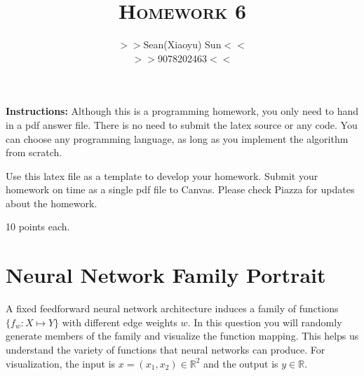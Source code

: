 \documentclass[a4paper]{article}
\title{\textsc{Homework 6}} %
\author{
$>>$Sean(Xiaoyu) Sun$<<$ \\
$>>$9078202463$<<$\\
}
\date{}
\theoremstyle{definition}
\def\R{\mathbb R}
\begin{document}
\maketitle 


\textbf{Instructions:} 
Although this is a programming homework, you only need to hand in a pdf answer file.
There is no need to submit the latex source or any code.
You can choose any programming language, as long as you implement the algorithm from scratch. 

Use this latex file as a template to develop your homework.
Submit your homework on time as a single pdf file to Canvas.
Please check Piazza for updates about the homework.

10 points each.

\section{Neural Network Family Portrait}
A fixed feedforward neural network architecture induces a family of functions $\{f_w: X \mapsto Y\}$ with different edge weights $w$.
In this question you will randomly generate members of the family and visualize the function mapping. 
This helps us understand the variety of functions that neural networks can produce. 
For visualization, the input is $x=(x_1, x_2) \in \R^2$ and the output is $y\in\R$.
\end{document}
